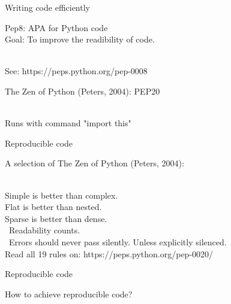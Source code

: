 \documentclass[compress]{beamer}
\begin{document}
\begin{frame}{Writing code efficiently}
	
Pep8: APA for Python code \\
Goal: To improve the readibility of code. \\\
	
See: https://peps.python.org/pep-0008
	
\end{frame}

\begin{frame}
The Zen of Python (Peters, 2004): PEP20 \\\

Runs with command "import this"

\end{frame}



\begin{frame}{Reproducible code}
	
A selection of The Zen of Python (Peters, 2004): \\\
	
Simple is better than complex. \\
Flat is better than nested. \\
Sparse is better than dense. \\\
Readability counts. \\\
Errors should never pass silently. Unless explicitly silenced. \\

Read all 19 rules on: https://peps.python.org/pep-0020/
	


	
\end{frame}



\begin{frame}{Reproducible code}
	
How to achieve reproducible code?
	
\end{frame}
\end{document}
